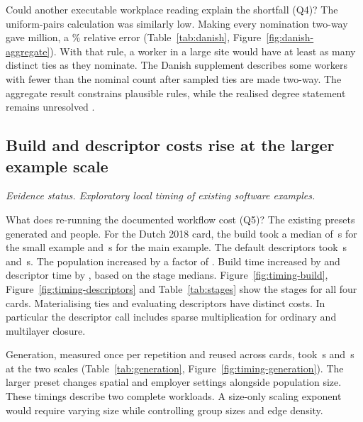 Could another executable workplace reading explain the shortfall (Q4)? The uniform-pairs calculation was similarly low. Making every nomination two-way gave \DanishTwoWay{} million, a \DanishTwoWayError\% relative error (Table~\ref{tab:danish}, Figure~\ref{fig:danish-aggregate}). With that rule, a worker in a large site would have at least as many distinct ties as they nominate. The Danish supplement describes some workers with fewer than the nominal count after sampled ties are made two-way. The aggregate result constrains plausible rules, while the realised degree statement remains unresolved \citep{cremers2025,almamunpredicting2026}.


\subsection{Build and descriptor costs rise at the larger example scale}
\label{res:runtime}
\textit{Evidence status. Exploratory local timing of existing software examples.}

What does re-running the documented workflow cost (Q5)? The existing presets generated \SmallPeople{} and \MainPeople{} people. For the Dutch 2018 card, the build took a median of \SmallDutchBuild{}\,s for the small example and \MainDutchBuild{}\,s for the main example. The default descriptors took \SmallDutchDescribe{}\,s and \MainDutchDescribe{}\,s. The population increased by a factor of \PopulationRatio{}. Build time increased by \BuildRatio{} and descriptor time by \DescriptorRatio{}, based on the stage medians. Figure~\ref{fig:timing-build}, Figure~\ref{fig:timing-descriptors} and Table~\ref{tab:stages} show the stages for all four cards. Materialising ties and evaluating descriptors have distinct costs. In particular the descriptor call includes sparse multiplication for ordinary and multilayer closure.


Generation, measured once per repetition and reused across cards, took \SmallGeneration{}\,s and \MainGeneration{}\,s at the two scales (Table~\ref{tab:generation}, Figure~\ref{fig:timing-generation}). The larger preset changes spatial and employer settings alongside population size. These timings describe two complete workloads. A size-only scaling exponent would require varying size while controlling group sizes and edge density.

\FloatBarrier
